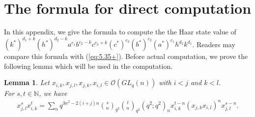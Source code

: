 \documentclass[table,a4paper,reqno]{amsart}
\numberwithin{equation}{section}
\newtheorem{lemma}[theorem]{Lemma}
\theoremstyle{definition}
\begin{document}
\section{The formula for direct computation}\label{append_1}
In this appendix, we give the formula to compute the the Haar state value of $(k^*)^{d_1+k}(h^*)^{d_2-k}a^{c_1}b^{c_2-k}c^{c_3+k}(c^*)^{c_3}(b^*)^{c_2}(a^*)^{c_1}h^{d_2}k^{d_1}$. Readers may compare this formula with (\ref{eq:5.35+}). Before actual computation, we prove the following lemma which will be used in the computation.
\begin{lemma}\label{lemma:append}
    Let $x_{i,k}, x_{j,l}, x_{j,k}, x_{i,l}\in\mathcal{O}(GL_q(n))$ with $i<j$ and $k<l$.\\
    For $s,t\in\mathbb{N}$, we have 
    \begin{equation}\label{eq:app1.1}
        \begin{split}
            x_{j,l}^sx_{i,k}^t=\sum_{n}q^{3n^2-2(i+j)n}{s\choose n}_{q^2}{t\choose n}_{q^2}(q^2;q^2)_nx_{i,k}^{t-n}(x_{j,k}x_{i,l})^{n}x_{j,l}^{s-n}.
        \end{split}
    \end{equation}
\end{lemma}
\end{document}
